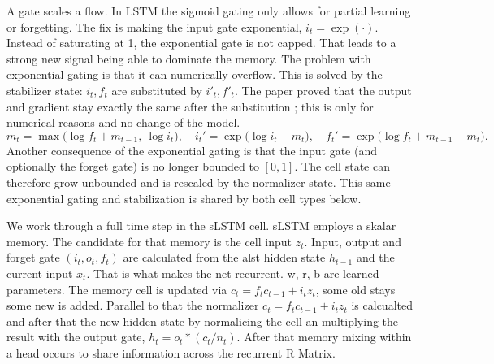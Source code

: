 A gate scales a flow. In LSTM the sigmoid gating only allows for partial learning
or forgetting. The fix is making the input gate exponential, $i_t=\exp(\cdot)$.
Instead of saturating at 1, the exponential gate is not capped. That leads to a
strong new signal being able to dominate the memory. The problem with exponential
gating is that it can numerically overflow. This is solved by the stabilizer
state: $i_t,f_t$ are substituted by $i'_t,f'_t$. The paper proved that the output
and gradient stay exactly the same after the substitution
\parencite[App.~A.2]{beck2024xlstm}; this is only for
numerical reasons and no change of the model.
\begin{equation}
  m_t=\max\!\big(\log f_t + m_{t-1},\ \log i_t\big),\quad
  i_t'=\exp\!\big(\log i_t - m_t\big),\quad
  f_t'=\exp\!\big(\log f_t + m_{t-1} - m_t\big).
  \label{eq:xlstm-stab}
\end{equation}
Another consequence of the exponential gating is that the input gate (and
optionally the forget gate) is no longer bounded to $[0,1]$. The cell state can
therefore grow unbounded and is rescaled by the normalizer state. This same
exponential gating and stabilization is shared by both cell types below.

%
 We work through a full time step in the sLSTM cell. sLSTM employs a skalar memory. The candidate for that memory is the cell input $z_t$. Input, output and forget gate $(i_t, o_t, f_t)$ are calculated from the alst hidden state $h_{t-1}$ and the current input $x_t$. That is what makes the net recurrent. w, r, b are learned parameters. The memory cell is updated via $c_t = f_t c_{t-1} + i_t z_t$, some old stays some new is added. Parallel to that the normalizer $c_t = f_t c_{t-1} + i_t z_t$ is calcualted and after that the new hidden state by normalicing the cell an multiplying the result with the output gate, $h_t = o_t * (c_t / n_t)$. After that memory mixing within a head occurs to share information across the recurrent R Matrix.

